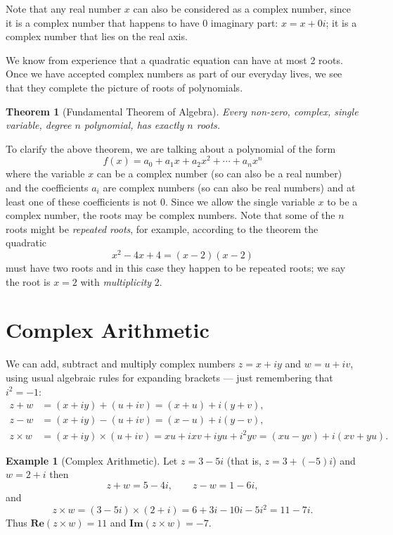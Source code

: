 \documentclass[
]{book}
\newtheorem{theorem}{Theorem}[chapter]
\theoremstyle{definition}
\theoremstyle{definition}
\newtheorem{example}{Example}[chapter]
\theoremstyle{definition}
\theoremstyle{definition}
\theoremstyle{remark}
\begin{document}
Note that any real number \(x\) can also be considered as a complex number, since it is a complex number that happens to have \(0\) imaginary part: \(x = x +0i\); it is a complex number that lies on the real axis.

We know from experience that a quadratic equation can have at most 2 roots. Once we have accepted complex numbers as part of our everyday lives, we see that they complete the picture of roots of polynomials.

\begin{theorem}[Fundamental Theorem of Algebra]
\protect\hypertarget{thm:FTA}{}\label{thm:FTA}Every non-zero, complex, single variable, degree \(n\) polynomial, has exactly \(n\) roots.
\end{theorem}

To clarify the above theorem, we are talking about a polynomial of the form
\[f(x)=a_0 + a_1 x + a_2 x^2 + \dotsb + a_n x^n\]
where the variable \(x\) can be a complex number (so can also be a real number) and the coefficients \(a_i\) are complex numbers (so can also be real numbers) and at least one of these coefficients is not \(0\). Since we allow the single variable \(x\) to be a complex number, the roots may be complex numbers. Note that some of the \(n\) roots might be \emph{repeated roots}, for example, according to the theorem the quadratic
\[x^2-4x+4=(x-2)(x-2)\]
must have two roots and in this case they happen to be repeated roots; we say the root is \(x=2\) with \emph{multiplicity} 2.

\hypertarget{complex-arithmetic}{%
\section{Complex Arithmetic}\label{complex-arithmetic}}

We can add, subtract and multiply complex numbers \(z = x+iy\) and \(w = u+iv\), using usual algebraic rules for expanding brackets --- just remembering that \(i^2 = -1\):
\begin{align*}
z + w &= (x + iy) + (u + iv) = (x+u) + i (y+v),\\
z - w &= (x + iy) - (u + iv) = (x-u) + i (y-v),\\
z \times w &= (x + iy) \times (u + iv) = x u + i x v + i yu + i^2 y v = (xu - yv) + i (xv + yu).
\end{align*}

\begin{example}[Complex Arithmetic]
\protect\hypertarget{exm:complexarithmetic}{}\label{exm:complexarithmetic}Let \(z = 3 - 5i\) (that is, \(z = 3 + (-5)i\)) and \(w = 2 + i\) then
\[
z + w = 5 - 4i, \qquad z - w = 1 - 6i,
\]
and
\[
z\times w = (3 - 5i)\times (2+i) = 6 + 3i - 10i - 5i^2 = 11 - 7i.
\]
Thus \(\mathbf{Re}(z\times w) = 11\) and \(\mathbf{Im}(z\times w) = -7\).
\end{example}
\end{document}
